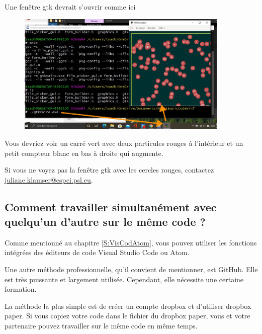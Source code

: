 \documentclass{article}
\begin{document}
Une fenêtre gtk devrait s'ouvrir comme ici
\begin{figure}[H]
\center
\includegraphics[width=0.9\textwidth]{Plots/MD_4XMing.jpeg}
\end{figure}
Vous devriez voir un carré vert avec deux particules rouges à l'intérieur et un petit compteur blanc en bas à droite qui augmente.

Si vous ne voyez pas la fenêtre gtk avec les cercles rouges, contactez \href{mailto:example@example.com}{juliane.klamser@espci.psl.eu}.
\subsection{Comment travailler simultanément avec quelqu'un d'autre sur le même code ?}
Comme mentionné au chapitre \ref{S:VisCodAtom}, vous pouvez utiliser les fonctions intégrées des éditeurs de code Visual Studio Code ou Atom. 

Une autre méthode professionnelle, qu'il convient de mentionner, est GitHub. Elle est très puissante et largement utilisée. Cependant, elle nécessite une certaine formation.

La méthode la plus simple est de créer un compte dropbox et d'utiliser dropbox paper. Si vous copiez votre code dans le fichier du dropbox paper, vous et votre partenaire pouvez travailler sur le même code en même temps.




%  
\end{document}
